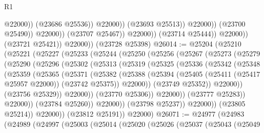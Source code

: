 \begin{lexlean}{R1}
\begin{coremodule}
                                            @22000))
                                        (@23686 @25536))
                                      @22000))
                                  (@23693 @25513))
                                @22000))
                            (@23700 @25490))
                          @22000))
                      (@23707 @25467))
                    @22000))
                (@23714 @25444))
              @22000))
          (@23721 @25421))
        @22000))
    (@23728 @25398)
@26014 := @25204
    (@25210
      (@25221
        (@25227
          (@25233
            (@25244
              (@25250
                (@25256
                  (@25267
                    (@25273
                      (@25279
                        (@25290
                          (@25296
                            (@25302
                              (@25313
                                (@25319
                                  (@25325
                                    (@25336
                                      (@25342
                                        (@25348
                                          (@25359
                                            (@25365
                                              (@25371
                                                (@25382
                                                  (@25388
                                                    (@25394
                                                      (@25405
                                                        (@25411 (@25417 @25957 @22000))
                                                        (@23742 @25375))
                                                      @22000))
                                                  (@23749 @25352))
                                                @22000))
                                            (@23756 @25329))
                                          @22000))
                                      (@23770 @25306))
                                    @22000))
                                (@23777 @25283))
                              @22000))
                          (@23784 @25260))
                        @22000))
                    (@23798 @25237))
                  @22000))
              (@23805 @25214))
            @22000))
        (@23812 @25191))
      @22000)
@26071 := @24977
    (@24983
      (@24989
        (@24997
          (@25003
            (@25014
              (@25020
                (@25026
                  (@25037
                    (@25043
                      (@25049

\end{coremodule}
\end{lexlean}
